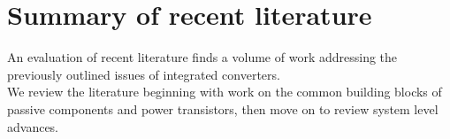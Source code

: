 \documentclass[letterpaper,twocolumn,10pt]{article}
\begin{document}

\section{Summary of recent literature}
An evaluation of recent literature finds a volume of work addressing the previously outlined issues of integrated converters.\\
We review the literature beginning with work on the common building blocks of passive components and power transistors, then move on to review system level advances.\\ 
\end{document}
